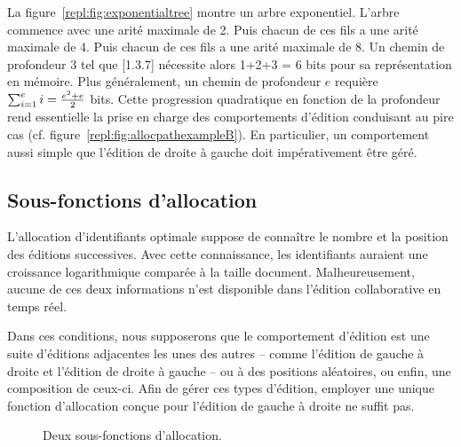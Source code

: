 La figure~\ref{repl:fig:exponentialtree} montre un arbre exponentiel. L'arbre
commence avec une arité maximale de 2. Puis chacun de ces fils a une arité
maximale de 4. Puis chacun de ces fils a une arité maximale de 8. Un chemin de
profondeur 3 tel que [1.3.7] nécessite alors 1+2+3 = 6 bits pour sa
représentation en mémoire.  Plus généralement, un chemin de profondeur $e$
requière $\textstyle\sum\nolimits_{i=1}^{e}i = {e^2 + e \over{2}}$ bits. Cette
progression quadratique en fonction de la profondeur rend essentielle la prise
en charge des comportements d'édition conduisant au pire cas
(cf. figure~\ref{repl:fig:allocpathexampleB}). En particulier, un comportement
aussi simple que l'édition de droite à gauche doit impérativement être géré.

\subsection{Sous-fonctions d'allocation}
\label{repl:subsec:suballocation}

L'allocation d'identifiants optimale suppose de connaître le nombre et la
position des éditions successives. Avec cette connaissance, les identifiants
auraient une croissance logarithmique comparée à la taille
document. Malheureusement, aucune de ces deux informations n'est disponible dans
l'édition collaborative en temps réel.

Dans ces conditions, nous supposerons que le comportement d'édition est une
suite d'éditions adjacentes les unes des autres -- comme l'édition de gauche à
droite et l'édition de droite à gauche -- ou à des positions aléatoires, ou
enfin, une composition de ceux-ci. Afin de gérer ces types d'édition, employer
une unique fonction d'allocation conçue pour l'édition de gauche à droite ne
suffit pas.

\begin{figure}
  \begin{center}
    \hspace{20pt}
    \caption[Deux sous-fonctions d'allocation]
    {\label{repl:fig:suballocation}Deux sous-fonctions d'allocation.}
  \end{center}
\end{figure}

